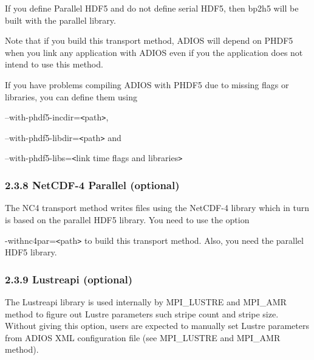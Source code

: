 \vspace{10pt}
If you define Parallel HDF5 and do not define serial HDF5, then bp2h5 will be built 
with the parallel library. 

\vspace{10pt}
Note that if you build this transport method, ADIOS will depend on PHDF5 when you 
link any application with ADIOS even if you the application does not intend to 
use this method. 

\vspace{10pt}
If you have problems compiling ADIOS with PHDF5 due to missing flags or libraries, 
you can define them using 

\vspace{10pt}
--with-phdf5-incdir=\texttt{<}path\texttt{>},

\vspace{10pt}
--with-phdf5-libdir=\texttt{<}path\texttt{>} and 

\vspace{10pt}
--with-phdf5-libs=\texttt{<}link time flags and libraries\texttt{>}\label{HToc182553342}

\vspace{10pt}
\subsubsection*{{\large \textbf{2.3.8 NetCDF-4 Parallel (optional)}}}

\vspace{10pt}
The NC4 transport method writes files using the NetCDF-4 library which in turn 
is based on the parallel HDF5 library. You need to use the option\-{}

\vspace{10pt}
-with\-{}nc4par=\texttt{<}path\texttt{>} to build this transport method. Also, 
you need the parallel HDF5 library. \label{HToc182553343}

\vspace{10pt}
\subsubsection*{{\large \textbf{2.3.9 Lustreapi (optional)}}}

\vspace{10pt}
The Lustreapi library is used internally by MPI\_LUSTRE and MPI\_AMR method to 
figure out Lustre parameters such stripe count and stripe size.  Without giving 
this option, users are expected to manually set Lustre parameters from ADIOS XML 
configuration file (see MPI\_LUSTRE and MPI\_AMR method).

